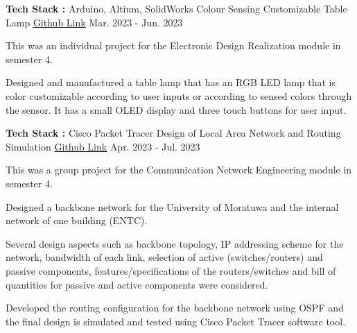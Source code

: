 \begin{cventries}

\cventry
{\textbf{Tech Stack :} Arduino, Altium, SolidWorks} %
{Colour Sensing Customizable Table Lamp} %
{\href{https://github.com/VijthanKurrshanth/Color-Sensing-Lamp-Project/tree/main}{Github Link}} %
{Mar. 2023 - Jun. 2023} %
{ %
\begin{cvitems}
\item {This was an individual project for the Electronic Design Realization module in semester 4.}
\item {Designed and manufactured a table lamp that has an RGB LED lamp that is color customizable according to user inputs or according to sensed colors through the sensor. It has a small OLED display and three touch buttons for user input.}
\end{cvitems}
}


\cventry
{\textbf{Tech Stack :} Cisco Packet Tracer} %
{Design of Local Area Network and Routing Simulation} %
{\href{https://github.com/VijthanKurrshanth/LAN-Design}{Github Link}} %
{Apr. 2023 - Jul. 2023} %
{ %
\begin{cvitems}
\item {This was a group project for the Communication Network Engineering module in semester 4.}
\item {Designed a backbone network for the University of Moratuwa and the internal network of one building (ENTC).} 
\item {Several design aspects such as backbone topology, IP addressing scheme for the network, bandwidth of each link, selection of active (switches/routers) and passive components, features/specifications of the routers/switches and bill of quantities for passive and active components were considered.}
\item {Developed the routing configuration for the backbone network using OSPF and the final design is simulated and tested using Cisco Packet Tracer software tool.}
\end{cvitems}
}



\end{cventries}
